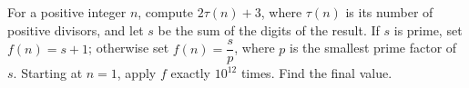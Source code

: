 For a positive integer $n$, compute $2\tau(n)+3$, where $\tau(n)$ is its number of positive divisors, and let $s$ be the sum of the digits of the result. If $s$ is prime, set $f(n)=s+1$; otherwise set $f(n)=\dfrac{s}{p}$, where $p$ is the smallest prime factor of $s$. Starting at $n=1$, apply $f$ exactly $10^{12}$ times. Find the final value.
